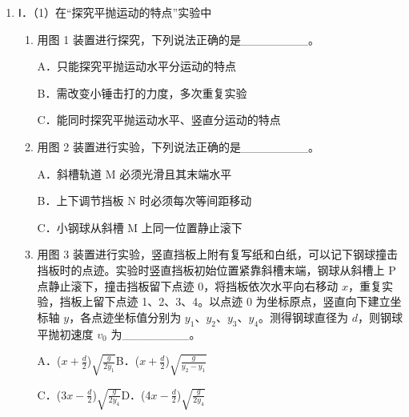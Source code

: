 \documentclass[\gkver]{gaokaozhenti}
\begin{document}
\begin{enumerate}
{D. 光子的动量  $p = mc$，光子的能量  $E = mc^2$，联立可得  $p = \frac{E}{c}$。则光子的动量  $p = \frac{W_0}{c} + \frac{h^2L^2}{2cmd^2\Delta x^2}$。故 D 正确。

故选 AD。
}

\item
Ⅰ．（1）在“探究平抛运动的特点”实验中
\begin{enumerate}[label=\protect\Circled{\arabic*}]
	\item
	用图 1 装置进行探究，下列说法正确的是\_\_\_\_\_\_\_\_。

	A．只能探究平抛运动水平分运动的特点

	B．需改变小锤击打的力度，多次重复实验

	C．能同时探究平抛运动水平、竖直分运动的特点
	\item
	用图 2 装置进行实验，下列说法正确的是\_\_\_\_\_\_\_\_。

	A．斜槽轨道 M 必须光滑且其末端水平

	B．上下调节挡板 N 时必须每次等间距移动

	C．小钢球从斜槽 M 上同一位置静止滚下
	\item
	用图 3 装置进行实验，竖直挡板上附有复写纸和白纸，可以记下钢球撞击挡板时的点迹。实验时竖直挡板初始位置紧靠斜槽末端，钢球从斜槽上 P 点静止滚下，撞击挡板留下点迹 0，将挡板依次水平向右移动 $x$，重复实验，挡板上留下点迹 1、2、3、4。以点迹 0 为坐标原点，竖直向下建立坐标轴 $y$，各点迹坐标值分别为 $y_{1}$、$y_{2}$、$y_{3}$、$y_{4}$。测得钢球直径为 $d$，则钢球平抛初速度 $v_{0}$ 为\_\_\_\_\_\_\_\_。

	A．($x + \frac{d}{2}$)$\sqrt {\frac{g}{{2{y_1}}}} $\qquad B．($x + \frac{d}{2}$)$\sqrt {\frac{g}{{{y_2} - {y_1}}}} $

	C．(3$x - \frac{d}{2}$)$\sqrt {\frac{g}{{2{y_4}}}} $\qquad D．(4$x - \frac{d}{2}$)$\sqrt {\frac{g}{{2{y_4}}}} $
\end{enumerate}
\end{enumerate}
\end{document}
